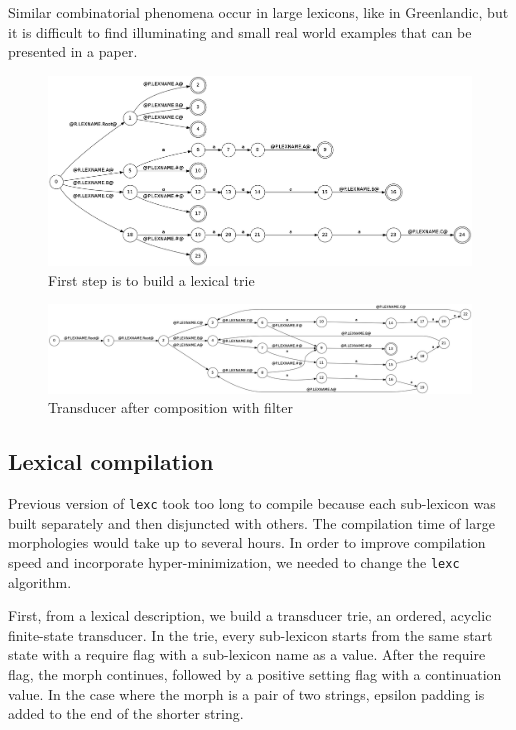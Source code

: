 \documentclass[11pt]{article}
\begin{document}
Similar combinatorial phenomena occur in large lexicons, like in Greenlandic, but it is difficult to find illuminating and small real 
world examples that can be presented in a paper.


\begin{figure}
    \includegraphics[width=\textwidth]{trie.png}
     \caption{First step is to build a lexical trie
     \label{fig:trie}}
\end{figure}


\begin{figure}
    \includegraphics[width=\textwidth]{after_comp.png}
     \caption{Transducer after composition with filter
     \label{fig:after}}
\end{figure}



\subsection{Lexical compilation}

Previous version of \texttt{lexc} took too long to compile because each sub-lexicon was built separately and then disjuncted with others. The compilation time of large morphologies would take up to several hours. In order to improve compilation speed and incorporate hyper-minimization, we needed to change the \texttt{lexc} algorithm.

First, from a lexical description, we build a transducer trie, an ordered, acyclic finite-state transducer. In the trie, every sub-lexicon 
starts from the same start state with a require flag with a sub-lexicon name as a value. After the require flag, the morph continues, followed 
by a positive setting flag with a continuation value. In the case where the morph is a pair of two strings, epsilon padding is added to the end of 
the shorter string.
\end{document}

